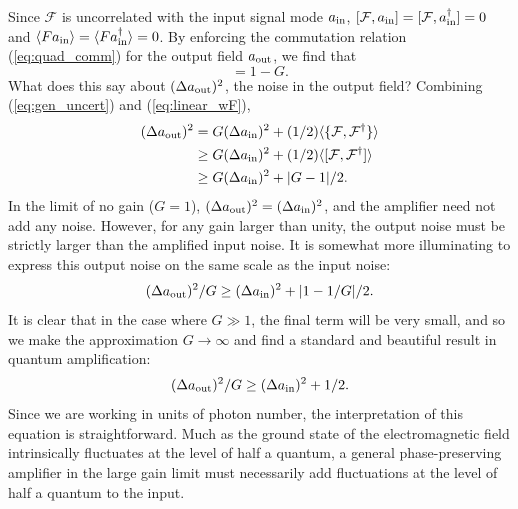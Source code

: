 Since $\mathcal{F}$ is uncorrelated with the input signal mode $a_{\rm in}$, $[\mathcal{F},a_{\rm in}] = [\mathcal{F},a_{\rm in}^\dagger] = 0$ and $\langle F a_{\rm in} \rangle = \langle F a_{\rm in}^\dagger \rangle = 0$.  By enforcing the commutation relation (\ref{eq:quad_comm}) for the output field $a_{\rm out}$, we find that
\begin{equation}
[\mathcal{F},\mathcal{F}^\dagger] = 1 - G.
\label{eq:F_comm}
\end{equation}
What does this say about $(\Delta a_{\rm out})^2$, the noise in the output field?  Combining (\ref{eq:gen_uncert}) and (\ref{eq:linear_wF}),
\begin{align}
(\Delta a_{\rm out})^2 &= G (\Delta a_{\rm in})^2 + (1/2) \langle \{ \mathcal{F},\mathcal{F}^\dagger \} \rangle \notag \\
&\geq G(\Delta a_{\rm in})^2 + (1/2) \langle [ \mathcal{F},\mathcal{F}^\dagger ] \rangle  \notag \\
&\geq G(\Delta a_{\rm in})^2 + | G - 1|/2.
\label{eq:output_noise}
\end{align}
In the limit of no gain ($G = 1$), $(\Delta a_{\rm out})^2 = (\Delta a_{\rm in})^2$, and the amplifier need not add any noise.  However, for any gain larger than unity, the output noise must be strictly larger than the amplified input noise.  It is somewhat more illuminating to express this output noise on the same scale as the input noise:
\begin{equation}
(\Delta a_{\rm out})^2 / G \geq (\Delta a_{\rm in})^2 + |1 - 1/G|/2.
\label{eq:output_noise_input_ref}
\end{equation}
It is clear that in the case where $G \gg 1$, the final term will be very small, and so we make the approximation $G \rightarrow \infty$ and find a standard and beautiful result in quantum amplification:
\begin{equation}
(\Delta a_{\rm out})^2 / G \geq (\Delta a_{\rm in})^2 + 1/2.
\label{eq:half_quantum}
\end{equation}
Since we are working in units of photon number, the interpretation of this equation is straightforward.  Much as the ground state of the electromagnetic field intrinsically fluctuates at the level of half a quantum, a general phase-preserving amplifier in the large gain limit must necessarily add fluctuations at the level of half a quantum to the input.

